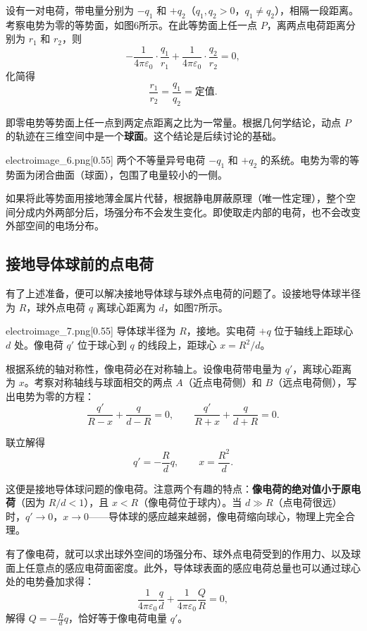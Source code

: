 设有一对电荷，带电量分别为 $-q_1$ 和 $+q_2$（$q_1, q_2 > 0$，$q_1 \neq q_2$），相隔一段距离。考察电势为零的等势面，如图6所示。在此等势面上任一点 $P$，离两点电荷距离分别为 $r_1$ 和 $r_2$，则
\[
    -\frac{1}{4\pi\varepsilon_0} \cdot \frac{q_1}{r_1} + \frac{1}{4\pi\varepsilon_0} \cdot \frac{q_2}{r_2} = 0,
\]
化简得
\[
    \frac{r_1}{r_2} = \frac{q_1}{q_2} = \text{定值}.
\]

即零电势等势面上任一点到两定点距离之比为一常量。根据几何学结论，动点 $P$ 的轨迹在三维空间中是一个\textbf{球面}。这个结论是后续讨论的基础。

\begin{singlefigure}[不等量异号电荷的零电势面]{electroimage_6.png}[0.55]
    两个不等量异号电荷 $-q_1$ 和 $+q_2$ 的系统。电势为零的等势面为闭合曲面（球面），包围了电量较小的一侧。
\end{singlefigure}

如果将此等势面用接地薄金属片代替，根据静电屏蔽原理（唯一性定理），整个空间分成内外两部分后，场强分布不会发生变化。即使取走内部的电荷，也不会改变外部空间的电场分布。

\subsection{接地导体球前的点电荷}

有了上述准备，便可以解决接地导体球与球外点电荷的问题了。设接地导体球半径为 $R$，球外点电荷 $q$ 离球心距离为 $d$，如图7所示。

\begin{singlefigure}[接地导体球前的点电荷]{electroimage_7.png}[0.55]
    导体球半径为 $R$，接地。实电荷 $+q$ 位于轴线上距球心 $d$ 处。像电荷 $q'$ 位于球心到 $q$ 的线段上，距球心 $x = R^2/d$。
\end{singlefigure}

根据系统的轴对称性，像电荷必在对称轴上。设像电荷带电量为 $q'$，离球心距离为 $x$。考察对称轴线与球面相交的两点 $A$（近点电荷侧）和 $B$（远点电荷侧），写出电势为零的方程：
\[
    \frac{q'}{R-x} + \frac{q}{d-R} = 0, \qquad \frac{q'}{R+x} + \frac{q}{d+R} = 0.
\]

联立解得
\[
    q' = -\frac{R}{d}q, \qquad x = \frac{R^2}{d}.
\]

这便是接地导体球问题的像电荷。注意两个有趣的特点：\textbf{像电荷的绝对值小于原电荷}（因为 $R/d < 1$），且 \textbf{$x < R$}（像电荷位于球内）。当 $d \gg R$（点电荷很远）时，$q' \to 0$，$x \to 0$——导体球的感应越来越弱，像电荷缩向球心，物理上完全合理。

有了像电荷，就可以求出球外空间的场强分布、球外点电荷受到的作用力、以及球面上任意点的感应电荷面密度。此外，导体球表面的感应电荷总量也可以通过球心处的电势叠加求得：
\[
    \frac{1}{4\pi\varepsilon_0} \frac{q}{d} + \frac{1}{4\pi\varepsilon_0} \frac{Q}{R} = 0,
\]
解得 $Q = -\frac{R}{d}q$，恰好等于像电荷电量 $q'$。


